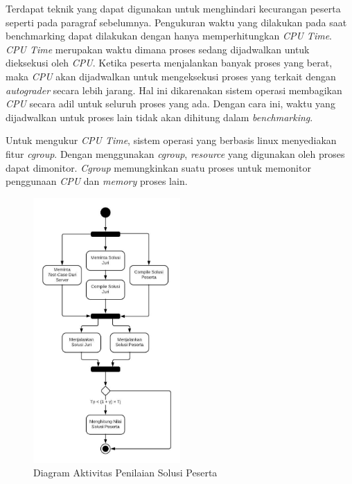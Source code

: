 \par Terdapat teknik yang dapat digunakan untuk menghindari kecurangan peserta seperti pada paragraf sebelumnya. Pengukuran waktu yang dilakukan pada saat benchmarking dapat dilakukan dengan hanya memperhitungkan \textit{CPU Time}. \textit{CPU Time} merupakan waktu dimana proses sedang dijadwalkan untuk dieksekusi oleh \textit{CPU}. Ketika peserta menjalankan banyak proses yang berat, maka \textit{CPU} akan dijadwalkan untuk mengeksekusi proses yang terkait dengan \textit{autograder} secara lebih jarang. Hal ini dikarenakan sistem operasi membagikan \textit{CPU} secara adil untuk seluruh proses yang ada. Dengan cara ini, waktu yang dijadwalkan untuk proses lain tidak akan dihitung dalam \textit{benchmarking}.

\par Untuk mengukur \textit{CPU Time}, sistem operasi yang berbasis linux menyediakan fitur \textit{cgroup}. Dengan menggunakan \textit{cgroup}, \textit{resource} yang digunakan oleh proses dapat dimonitor. \textit{Cgroup} memungkinkan suatu proses untuk memonitor penggunaan \textit{CPU} dan \textit{memory} proses lain. 

\begin{figure}[ht!]
    \centering
    \includegraphics[width=0.5\textwidth]{images/cpu-time-counting}
    \caption{Diagram Aktivitas Penilaian Solusi Peserta}
    \label{fig:cpu-time-counting}
\end{figure}

